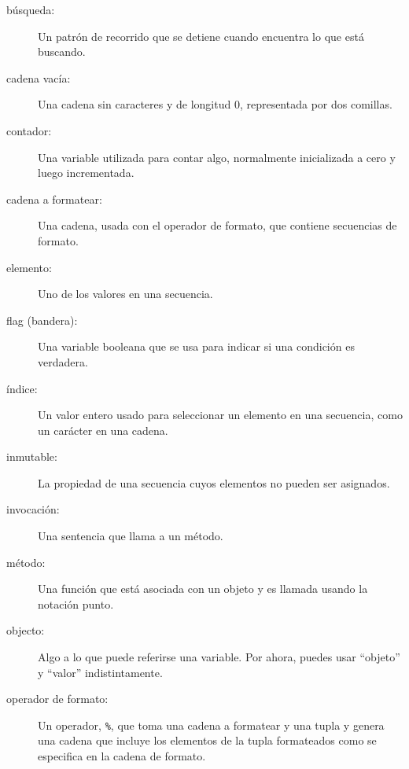 \begin{description}

\item[búsqueda:] Un patrón de recorrido que se detiene
cuando encuentra lo que está buscando.

\item[cadena vacía:] Una cadena sin caracteres y de longitud 0, representada por
dos comillas.

\item[contador:] Una variable utilizada para contar algo, normalmente inicializada
a cero y luego incrementada.

\item[cadena a formatear:] Una cadena, usada con el operador de formato,
que contiene secuencias de formato.

\item[elemento:] Uno de los valores en una secuencia.

\item[flag (bandera):] Una variable booleana que se usa para indicar si
una condición es verdadera.

\item[índice:] Un valor entero usado para seleccionar un elemento en
una secuencia, como un carácter en una cadena.

\item[inmutable:] La propiedad de una secuencia cuyos elementos
no pueden ser asignados.

\item[invocación:] Una sentencia que llama a un método.

\item[método:] Una función que está asociada con un objeto y es llamada
usando la notación punto.

\item[objecto:] Algo a lo que puede referirse una variable. Por ahora,
puedes usar ``objeto'' y ``valor'' indistintamente.

\item[operador de formato:] Un operador, {\tt \%}, que toma una cadena 
a formatear y una tupla y genera una cadena que incluye
los elementos de la tupla formateados como se especifica en la cadena de formato.


\end{description}
